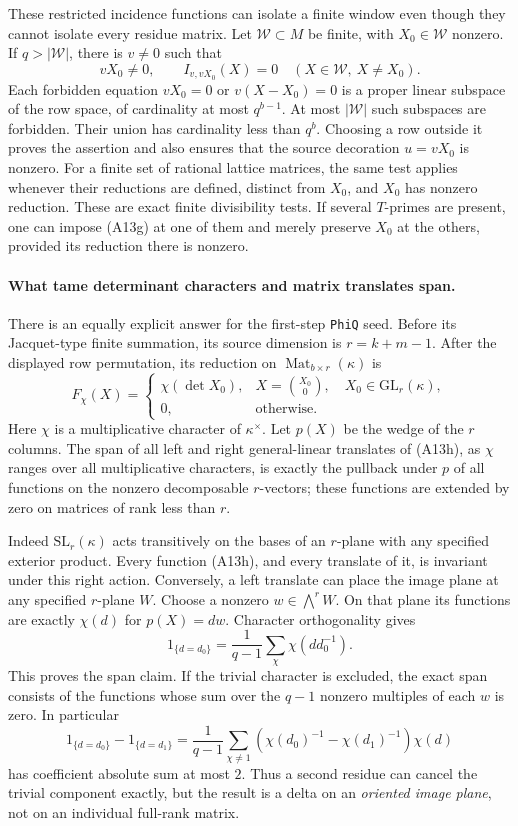 \documentclass[11pt]{article}
\theoremstyle{definition}\newtheorem{definition}[theorem]{Definition}\newtheorem{remark}[theorem]{Remark}
\begin{document}
These restricted incidence functions can isolate a finite
window even though they cannot isolate every residue matrix.
Let $\mathcal W\subset M$ be finite, with $X_0\in\mathcal W$
nonzero.  If $q>|\mathcal W|$, there is $v\ne0$ such that
\[
 vX_0\ne0,\qquad
 I_{v,vX_0}(X)=0\quad(X\in\mathcal W,\ X\ne X_0).
 \tag{A13g}
\]
Each forbidden equation $vX_0=0$ or $v(X-X_0)=0$
is a proper linear subspace of the row space, of cardinality
at most $q^{b-1}$.  At most $|\mathcal W|$ such subspaces
are forbidden.  Their union has cardinality less than $q^b$.
Choosing a row outside it proves the assertion and also
ensures that the source decoration $u=vX_0$ is nonzero.
For a finite set of rational lattice matrices, the same test
applies whenever their reductions are defined, distinct from
$X_0$, and $X_0$ has nonzero reduction.  These are exact
finite divisibility tests.  If several $T$-primes are present,
one can impose (A13g) at one of them and merely preserve
$X_0$ at the others, provided its reduction there is nonzero.

\paragraph{What tame determinant characters and matrix translates span.}
There is an equally explicit answer for the first-step
\texttt{PhiQ} seed.  Before its Jacquet-type finite summation,
its source dimension is $r=k+m-1$.  After the displayed row
permutation, its reduction on
$\operatorname{Mat}_{b\times r}(\kappa)$ is
\[
 F_\chi(X)=
 \begin{cases}
   \chi(\det X_0),&X=\binom{X_0}{0},\quad X_0\in\mathrm{GL}_r(\kappa),\\
   0,&\text{otherwise}.
 \end{cases}
 \tag{A13h}
\]
Here $\chi$ is a multiplicative character of $\kappa^\times$.
Let $p(X)$ be the wedge of the $r$ columns.  The span of
all left and right general-linear translates of (A13h),
as $\chi$ ranges over all multiplicative characters, is
exactly the pullback under $p$ of all functions on the
nonzero decomposable $r$-vectors; these functions are extended
by zero on matrices of rank less than $r$.

Indeed $\mathrm{SL}_r(\kappa)$ acts transitively on the
bases of an $r$-plane with any specified exterior product.
Every function (A13h), and every translate of it, is invariant
under this right action.  Conversely, a left translate can
place the image plane at any specified $r$-plane $W$.
Choose a nonzero $w\in\bigwedge^rW$.  On that plane its
functions are exactly $\chi(d)$ for $p(X)=dw$.
Character orthogonality gives
\[
 1_{\{d=d_0\}}
       =\frac1{q-1}\sum_{\chi}\chi(dd_0^{-1}).
 \tag{A13i}
\]
This proves the span claim.  If the trivial character is
excluded, the exact span consists of the functions whose
sum over the $q-1$ nonzero multiples of each $w$ is zero.
In particular
\[
 1_{\{d=d_0\}}-1_{\{d=d_1\}}
   =\frac1{q-1}\sum_{\chi\ne1}
           (\chi(d_0)^{-1}-\chi(d_1)^{-1})\chi(d)
 \tag{A13j}
\]
has coefficient absolute sum at most $2$.
Thus a second residue can cancel the trivial component
exactly, but the result is a delta on an \emph{oriented
image plane}, not on an individual full-rank matrix.
\end{document}
